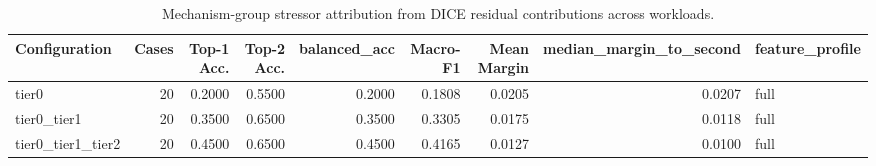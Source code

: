 \begin{table}[t]
\centering
\caption{Mechanism-group stressor attribution from DICE residual contributions across workloads.}
\label{tab:dice_stressor_diagnosis}
\footnotesize
\begin{tabular}{lrrrrrrrl}
\toprule
Configuration & Cases & Top-1 Acc. & Top-2 Acc. & balanced_acc & Macro-F1 & Mean Margin & median_margin_to_second & feature_profile \\
\midrule
tier0 & 20 & 0.2000 & 0.5500 & 0.2000 & 0.1808 & 0.0205 & 0.0207 & full \\
tier0_tier1 & 20 & 0.3500 & 0.6500 & 0.3500 & 0.3305 & 0.0175 & 0.0118 & full \\
tier0_tier1_tier2 & 20 & 0.4500 & 0.6500 & 0.4500 & 0.4165 & 0.0127 & 0.0100 & full \\
\bottomrule
\end{tabular}

\end{table}
